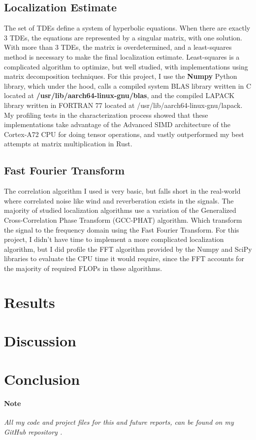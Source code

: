 \documentclass[12pt]{article}
\begin{document}
\subsection{Localization Estimate}
	The set of TDEs define a system of hyperbolic equations. When there are exactly 3 TDEs, the equations are represented by a singular matrix, with one solution. With more than 3 TDEs, the matrix is overdetermined, and a least-squares method is necessary to make the final localization estimate. Least-squares is a complicated algorithm to optimize, but well studied, with implementations using matrix decomposition techniques. For this project, I use the \textbf{Numpy} Python library, which under the hood, calls a compiled system BLAS library written in C located at \textbf{/usr/lib/aarch64-linux-gnu/blas}, and the compiled LAPACK library written in FORTRAN 77 located at {/usr/lib/aarch64-linux-gnu/lapack}. My profiling tests in the characterization process showed that these implementations take advantage of the Advanced SIMD architecture of the Cortex-A72 CPU for doing tensor operations, and vastly outperformed my best attempts at matrix multiplication in Rust.

\subsection{Fast Fourier Transform}
	The correlation algorithm I used is very basic, but falls short in the real-world where correlated noise like wind and reverberation exists in the signals. The majority of studied localization algorithms use a variation of the Generalized Cross-Correlation Phase Transform (GCC-PHAT) algorithm. Which transform the signal to the frequency domain using the Fast Fourier Transform. For this project, I didn't have time to implement a more complicated localization algorithm, but I did profile the FFT algorithm provided by the Numpy and SciPy libraries to evaluate the CPU time it would require, since the FFT accounts for the majority of required FLOPs in these algorithms. 

\section{Results}\label{sec:results}

\section{Discussion}\label{sec:discussion}

\section{Conclusion}\label{sec:conclusion}

\paragraph{Note}
\textit{All my code and project files for this and future reports, can be found on my GitHub repository \cite{lybbert2024classwork}.}



\end{document}
